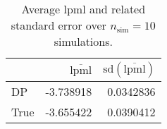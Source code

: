\begin{table}[H]

\caption{Average lpml and related standard error over $n_{\text{sim}} = 10$ simulations.}
\centering
\begin{tabular}[t]{lrr}
\toprule
  & $\overbar{\text{lpml}}$ & $\text{sd}(\overbar{\text{lpml}})$\\
\midrule
DP & -3.738918 & 0.0342836\\
True & -3.655422 & 0.0390412\\
\bottomrule
\end{tabular}
\end{table}